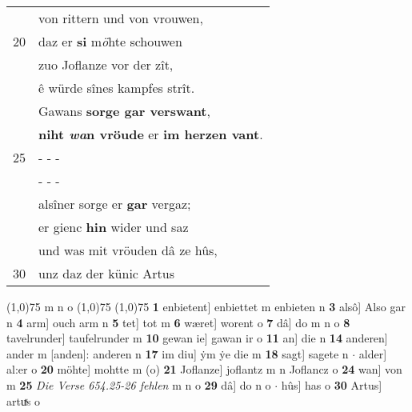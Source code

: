 \documentclass[8pt,a4paper,notitlepage]{article}
\begin{document}
\begin{table}[ht]
\begin{minipage}[t]{0.5\linewidth}
\begin{tabular}{rl}
 & von rittern und von vrouwen,\\ 
20 & daz er \textbf{si} m\textit{ö}hte schouwen\\ 
 & zuo Joflanze vor der zît,\\ 
 & ê würde sînes kampfes strît.\\ 
 & Gawans \textbf{sorge gar verswant},\\ 
 & \textbf{niht \textit{wa}n vröude} er \textbf{im herzen vant}.\\ 
25 & \multicolumn{1}{l}{ - - - }\\ 
 & \multicolumn{1}{l}{ - - - }\\ 
 & alsîner sorge er \textbf{gar} vergaz;\\ 
 & er gienc \textbf{hin} wider und saz\\ 
 & und was mit vröuden dâ ze hûs,\\ 
30 & unz daz der künic Artus\\ 
\end{tabular}
\scriptsize
\line(1,0){75} \newline
m n o \newline
\line(1,0){75} \newline
\newline
\line(1,0){75} \newline
\textbf{1} enbietent] enbiettet m enbieten n \textbf{3} alsô] Also gar n \textbf{4} arm] ouch arm n \textbf{5} tet] tot m \textbf{6} wæret] worent o \textbf{7} dâ] do m n o \textbf{8} tavelrunder] taufelrunder m \textbf{10} gewan ie] gawan ir o \textbf{11} an] die n \textbf{14} anderen] ander m [anden]: anderen n \textbf{17} im diu] ẏm ẏe die m \textbf{18} sagt] sagete n  $\cdot$ alder] al:er o \textbf{20} möhte] mohtte m (o) \textbf{21} Joflanze] joflantz m n Joflancz o \textbf{24} wan] von m \textbf{25} \textit{Die Verse 654.25-26 fehlen} m n o  \textbf{29} dâ] do n o  $\cdot$ hûs] has o \textbf{30} Artus] artuͯs o \newline
\end{minipage}
\end{table}
\newpage
\end{document}
